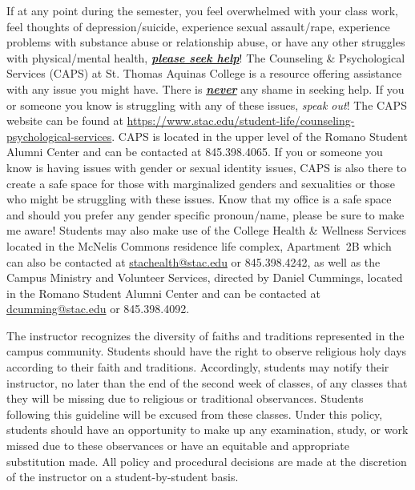 \documentclass[11pt,letterpaper]{article}
\begin{document}
If at any point during the semester, you feel overwhelmed with your class work, feel thoughts of depression/suicide, experience sexual assault/rape, experience problems with substance abuse or relationship abuse, or have any other struggles with physical/mental health, \underline{\bfseries\itshape please seek help}! The Counseling \& Psychological Services (CAPS) at St. Thomas Aquinas College is a resource offering assistance with any issue you might have. There is \underline{\bfseries\itshape never} any shame in seeking help. If you or someone you know is struggling with any of these issues, {\itshape speak out}! The CAPS website can be found at \href{https://www.stac.edu/student-life/counseling-psychological-services}{https://www.stac.edu/student-life/counseling-psychological-services}. CAPS is located in the upper level of the Romano Student Alumni Center and can be contacted at 845.398.4065. If you or someone you know is having issues with gender or sexual identity issues, CAPS is also there to create a safe space for those with marginalized genders and sexualities or those who might be struggling with these issues. Know that my office is a safe space and should you prefer any gender specific pronoun/name, please be sure to make me aware! Students may also make use of the College Health \& Wellness Services located in the McNelis Commons residence life complex, Apartment~2B which can also be contacted at \href{mailto:stachealth@stac.edu}{stachealth@stac.edu} or 845.398.4242, as well as the Campus Ministry and Volunteer Services, directed by Daniel Cummings, located in the Romano Student Alumni Center and can be contacted at \href{mailto:dcumming@stac.edu}{dcumming@stac.edu} or 845.398.4092.
\sectionbreak



The instructor recognizes the diversity of faiths and traditions represented in the campus community. Students should have the right to observe religious holy days according to their faith and traditions. Accordingly, students may notify their instructor, no later than the end of the second week of classes, of any classes that they will be missing due to religious or traditional observances. Students following this guideline will be excused from these classes. Under this policy, students should have an opportunity to make up any examination, study, or work missed due to these observances or have an equitable and appropriate substitution made. All policy and procedural decisions are made at the discretion of the instructor on a student-by-student basis. 
\sectionbreak
\end{document}
